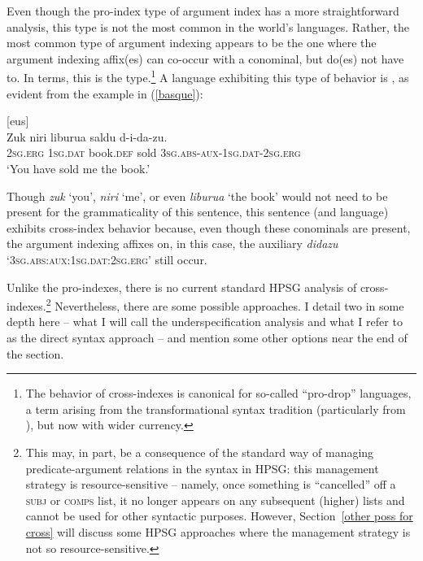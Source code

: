 \documentclass[output=paper
 	        ,biblatex
                ,babelshorthands
                ,newtxmath
                ,draftmode
                ,colorlinks, citecolor=brown
]{langscibook}
\begin{document}
Even though the pro-index type of argument index has a more straightforward analysis, this type is
not the most common in the world's languages. Rather, the most common type of argument indexing
appears to be the one where the argument indexing affix(es) can co-occur with a conominal, but
do(es) not have to.  In 
terms, this is the  type.\footnote{The behavior of cross-indexes is canonical for so-called ``pro-drop'' languages, a term arising from the transformational syntax tradition (particularly from \citealt[, Section~4.3]{Chomsky81a}), but now with wider currency.} A language exhibiting this type of behavior is , as evident from the example in (\ref{basque}):    
%
\begin{samepage}
\begin{exe}
\ex\label{basque}  [eus] \citep[98]{laka96} \\
\gll Zuk niri liburua saldu d-i-da-zu. \\
\textsc{2sg.erg} \textsc{1sg.dat} book.\textsc{def} sold \textsc{3sg.abs}-\textsc{aux}-\textsc{1sg.dat}-\textsc{2sg.erg} \\
\glt `You have sold me the book.' 
\end{exe} 
\end{samepage}
%
Though \textit{zuk} `you', \textit{niri} `me', or even \textit{liburua}  `the book' would not need to be present for the grammaticality of this sentence, this sentence (and language) exhibits cross-index behavior because, even though these conominals are present, the argument indexing affixes on, in this case, the auxiliary \textit{didazu} `\textsc{3sg.abs}:\-\textsc{aux}:\-\textsc{1sg.dat}:\-\textsc{2sg.erg}' still occur. 

Unlike the pro-indexes, there is no current standard HPSG analysis of cross-indexes.\footnote{This may, in part, be a consequence of the standard way of managing predicate-argument relations in the syntax in HPSG: this management strategy is resource-sensitive -- namely, once something is ``cancelled'' off a \textsc{subj} or \textsc{comps} list, it no longer appears on any subsequent (higher) lists and cannot be used for other syntactic purposes. However, Section~\ref{other poss for cross} will discuss some HPSG approaches where the management strategy is not so resource-sensitive.} Nevertheless, there are some possible approaches. I detail two in some depth here -- what I will call the underspecification analysis and what I refer to as the direct syntax approach -- and mention some other options near the end of the section.
\end{document}
